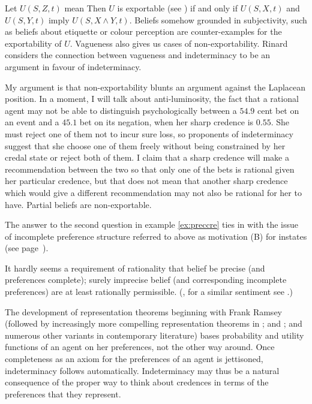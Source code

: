 \documentclass[11pt]{article}
\begin{document}
Let $U(S,Z,t)$ mean  Then $U$ is exportable (see ) if
and only if $U(S,X,t)$ and $U(S,Y,t)$ imply $U(S,X\wedge{}Y,t)$.
Beliefs somehow grounded in subjectivity, such as beliefs about
etiquette or colour perception are counter-examples for the
exportability of $U$. Vagueness also gives us cases of
non-exportability. Rinard considers the connection between vagueness
and indeterminacy to be an argument in favour of indeterminacy.

My argument is that non-exportability blunts an argument against the
Laplacean position. In a moment, I will talk about anti-luminosity,
the fact that a rational agent may not be able to distinguish
psychologically between a $54.9$ cent bet on an event and a $45.1$ bet
on its negation, when her sharp credence is $0.55$. She must reject
one of them not to incur sure loss, so proponents of indeterminacy
suggest that she choose one of them freely without being constrained
by her credal state or reject both of them. I claim that a sharp
credence will make a recommendation between the two so that only one
of the bets is rational given her particular credence, but that does
not mean that another sharp credence which would give a different
recommendation may not also be rational for her to have. Partial
beliefs are non-exportable.

The answer to the second question in example \ref{ex:preccre} ties in
with the issue of incomplete preference structure referred to above as
motivation (B) for instates (see page~\pageref{page:houwieve}).

\begin{quotex}
  It hardly seems a requirement of rationality that belief be precise
  (and preferences complete); surely imprecise belief (and
  corresponding incomplete preferences) are at least rationally
  permissible. (, for a similar
  sentiment see .)
\end{quotex}

The development of representation theorems beginning with Frank Ramsey
(followed by increasingly more compelling representation theorems in
; and ; and numerous other
variants in contemporary literature) bases probability and utility
functions of an agent on her preferences, not the other way around.
Once completeness as an axiom for the preferences of an agent is
jettisoned, indeterminacy follows automatically. Indeterminacy may
thus be a natural consequence of the proper way to think about
credences in terms of the preferences that they represent.
\end{document}
